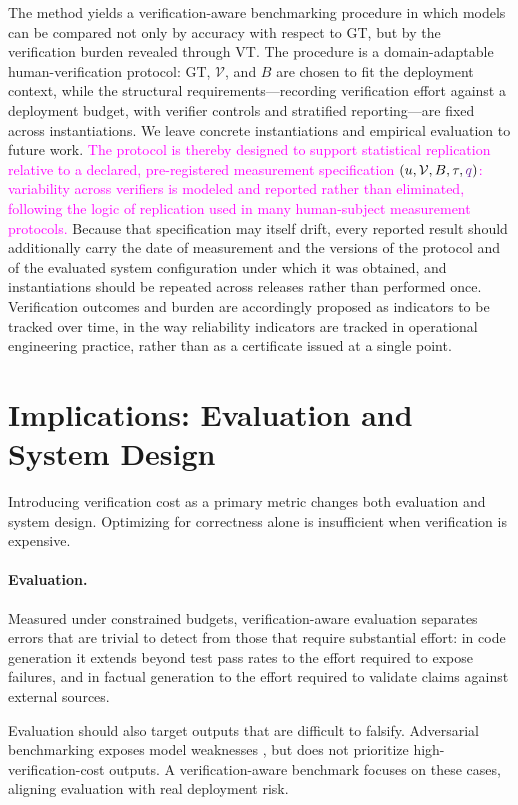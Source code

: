 \documentclass[11pt]{article}
\newcommand{\rev}[1]{\textcolor{magenta}{#1}}
\newcommand{\tidy}[1]{\textcolor{blue!60!black}{#1}}
\newcommand{\drift}[1]{\textcolor{cyan!85!black}{#1}}
\newcommand{\viola}[1]{\textcolor[HTML]{7030A0}{#1}}
\newcommand{\rev}[1]{#1}
\newcommand{\tidy}[1]{#1}
\newcommand{\drift}[1]{#1}
\newcommand{\viola}[1]{#1}
\begin{document}
{The method yields a verification-aware benchmarking procedure in which models can be compared not only by accuracy with respect to GT, but by the verification burden revealed through VT. \viola{The procedure is a domain-adaptable human-verification protocol: GT, $\mathcal{V}$, and $B$ are chosen to fit the deployment context}, while the structural requirements---recording verification effort against a deployment budget, with verifier controls and stratified reporting---are fixed across instantiations. We leave concrete instantiations and empirical evaluation to future work.}
\rev{The protocol is thereby designed to support statistical replication relative to a declared, pre-registered measurement specification $(u,\mathcal{V},B,\tau,\viola{q})$: variability across verifiers is modeled and reported rather than eliminated, following the logic of replication used in many human-subject measurement protocols.}
\drift{Because that specification may itself drift, every reported result should additionally carry the date of measurement and the versions of the protocol and of the evaluated system configuration under which it was obtained, and instantiations should be repeated across releases rather than performed once. \viola{Verification outcomes and burden are accordingly proposed as indicators to be tracked over time}, in the way reliability indicators are tracked in operational engineering practice, rather than as a certificate issued at a single point.}


\section{Implications: Evaluation and System Design}
\label{sec:implications}

Introducing verification cost as a primary metric changes both evaluation and system design. Optimizing for correctness alone is insufficient when verification is expensive.

\paragraph{Evaluation.} \tidy{Measured under constrained budgets, verification-aware evaluation separates errors that are trivial to detect from those that require substantial effort: in code generation it extends beyond test pass rates to the effort required to expose failures, and in factual generation to the effort required to validate claims against external sources.}

Evaluation should also target outputs that are difficult to falsify. Adversarial benchmarking exposes model weaknesses \citep{kiela2021dynabench}, but does not prioritize high-verification-cost outputs. A verification-aware benchmark focuses on these cases, aligning evaluation with real deployment risk.
\end{document}
